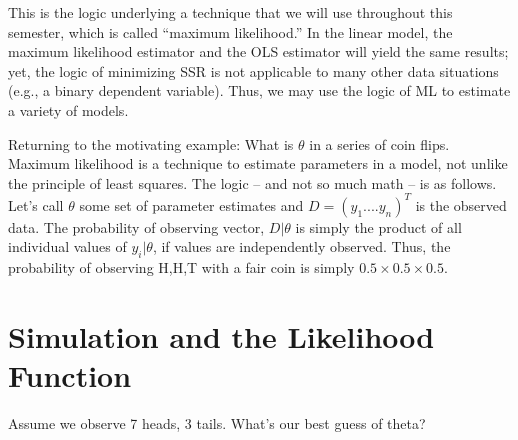 \documentclass[
]{book}
\begin{document}
This is the logic underlying a technique that we will use throughout this semester, which is called ``maximum likelihood.'' In the linear model, the maximum likelihood estimator and the OLS estimator will yield the same results; yet, the logic of minimizing SSR is not applicable to many other data situations (e.g., a binary dependent variable). Thus, we may use the logic of ML to estimate a variety of models.

Returning to the motivating example: What is \(\theta\) in a series of coin flips. Maximum likelihood is a technique to estimate parameters in a model, not unlike the principle of least squares. The logic -- and not so much math -- is as follows. Let's call \(\theta\) some set of parameter estimates and \(D=(y_1....y_n)^T\) is the observed data. The probability of observing vector, \(D|\theta\) is simply the product of all individual values of \(y_i | \theta\), if values are independently observed. Thus, the probability of observing H,H,T with a fair coin is simply \(0.5 \times 0.5 \times 0.5\).

\section{Simulation and the Likelihood Function}\label{simulation-and-the-likelihood-function}

Assume we observe 7 heads, 3 tails. What's our best guess of theta?
\end{document}
